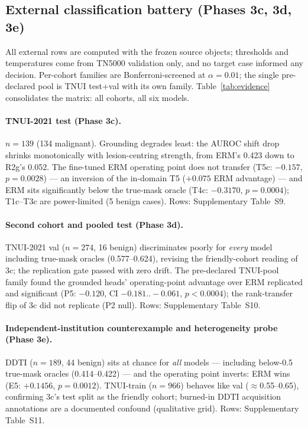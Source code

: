 \documentclass[jimh,article,submit,moreauthors,pdftex]{Definitions/tsp}
\begin{document}
\subsection{External classification battery (Phases 3c, 3d, 3e)}
\label{subsec:res_external}

All external rows are computed with the frozen source objects;
thresholds and temperatures come from TN5000 validation only, and no
target case informed any decision. Per-cohort families are
Bonferroni-screened at $\alpha = 0.01$; the single pre-declared pool is
TNUI test+val with its own family. Table~\ref{tab:evidence}
consolidates the matrix: all cohorts, all six models.

\paragraph{TNUI-2021 test (Phase 3c).}
$n{=}139$ (134 malignant). Grounding degrades least: the AUROC shift
drop shrinks monotonically with lesion-centring strength, from ERM's
0.423 down to R2g's 0.052. The fine-tuned ERM operating point does not
transfer (T5c: $-0.157$, $p{=}0.0028$) --- an inversion of the
in-domain T5 ($+0.075$ ERM advantage) --- and ERM sits significantly below the true-mask oracle
(T4c: $-0.3170$, $p{=}0.0004$); T1c--T3c are power-limited (5 benign
cases). Rows: Supplementary Table~S9.

\paragraph{Second cohort and pooled test (Phase 3d).}
TNUI-2021 val ($n{=}274$, 16 benign) discriminates poorly for
\emph{every} model including true-mask oracles (0.577--0.624),
revising the friendly-cohort reading of 3c; the replication gate
passed with zero drift. The pre-declared TNUI-pool family found the
grounded heads' operating-point advantage over ERM replicated and
significant (P5: $-0.120$, CI $-0.181..-0.061$, $p{<}0.0004$); the
rank-transfer flip of 3c did not replicate (P2 null). Rows:
Supplementary Table~S10.

\paragraph{Independent-institution counterexample and heterogeneity
probe (Phase 3e).}
DDTI ($n{=}189$, 44 benign) sits at chance for \emph{all} models ---
including below-0.5 true-mask oracles (0.414--0.422) --- and the
operating point inverts: ERM wins (E5: $+0.1456$, $p{=}0.0012$).
TNUI-train ($n{=}966$) behaves like val ($\approx$0.55--0.65),
confirming 3c's test split as the friendly cohort; burned-in DDTI
acquisition annotations are a documented confound (qualitative grid).
Rows: Supplementary Table~S11.
\end{document}
